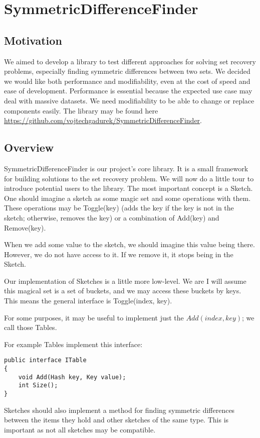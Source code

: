 \chapter{SymmetricDifferenceFinder}

\section{Motivation}
We aimed to develop a library to test different approaches for solving set recovery problems, especially finding symmetric differences between two sets. We decided we would like both performance and modifiability, even at the cost of speed and ease of development. Performance is essential because the expected use case may deal with massive datasets. We need modifiability to be able to change or replace components easily.
 The library may be found here \url{https://github.com/vojtechgadurek/SymmetricDifferenceFinder}.

\section{Overview}
SymmetricDifferenceFinder is our project's core library. It is a small framework for building solutions to the set recovery problem. 
We will now do a little tour to introduce potential users to the library. The most important concept is a Sketch. One should imagine a sketch as some magic set and some operations with them. These operations may be Toggle(key) (adds the key if the key is not in the sketch; otherwise, removes the key) or a combination of Add(key) and Remove(key). 

When we add some value to the sketch, we should imagine this value being there. However, we do not have access to it. If we remove it, it stops being 
in the Sketch. 

Our implementation of Sketches is a little more low-level. We are 
I will assume this magical set is a set of buckets, and we may access these buckets by keys. This means the general interface is Toggle(index, key).

For some purposes, it may be useful to implement just the $Add(index, key)$; we call those Tables.

For example Tables implement this interface:
\begin{lstlisting}
public interface ITable
{
    void Add(Hash key, Key value);
    int Size();
}
\end{lstlisting}

Sketches should also implement a method for finding symmetric differences between the items they hold and other sketches of the same type. This is important as not all sketches may be compatible.

